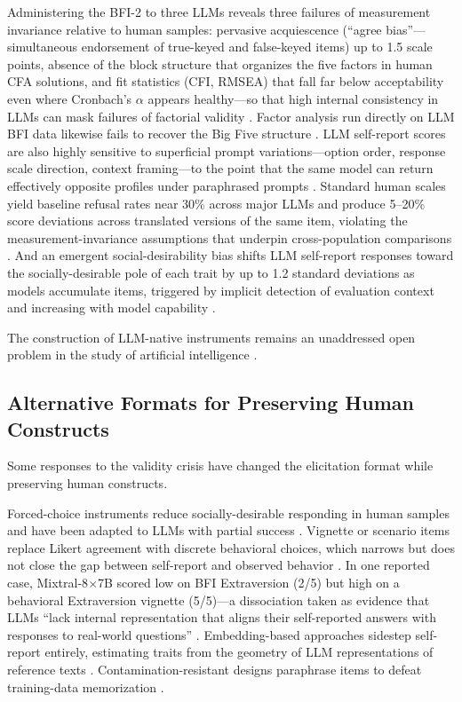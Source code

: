 \documentclass[11pt]{article}
\begin{document}
Administering the BFI-2 to three LLMs reveals three failures of measurement invariance relative to human samples: pervasive acquiescence (``agree bias''---simultaneous endorsement of true-keyed and false-keyed items) up to 1.5 scale points, absence of the block structure that organizes the five factors in human CFA solutions, and fit statistics (CFI, RMSEA) that fall far below acceptability even where Cronbach's $\alpha$ appears healthy---so that high internal consistency in LLMs can mask failures of factorial validity \citep{dorner2023generalize}.
Factor analysis run directly on LLM BFI data likewise fails to recover the Big Five structure \citep{wang2025gpt4roleplay}.
LLM self-report scores are also highly sensitive to superficial prompt variations---option order, response scale direction, context framing---to the point that the same model can return effectively opposite profiles under paraphrased prompts \citep{gupta2024self}.
Standard human scales yield baseline refusal rates near 30\% across major LLMs and produce 5--20\% score deviations across translated versions of the same item, violating the measurement-invariance assumptions that underpin cross-population comparisons \citep{xie2025aipsychobench}.
And an emergent social-desirability bias shifts LLM self-report responses toward the socially-desirable pole of each trait by up to 1.2 standard deviations as models accumulate items, triggered by implicit detection of evaluation context and increasing with model capability \citep{salecha2024social_desirability}.

The construction of LLM-native instruments remains an unaddressed open problem in the study of artificial intelligence \citep{wen2024personality, ye2026llmpsychometrics}.

\subsection{Alternative Formats for Preserving Human Constructs}
\label{sec:rw-alternatives}

Some responses to the validity crisis have changed the elicitation format while preserving human constructs.

Forced-choice instruments reduce socially-desirable responding in human samples and have been adapted to LLMs with partial success \citep{li-etal-2025-decoding-llm}.
Vignette or scenario items replace Likert agreement with discrete behavioral choices, which narrows but does not close the gap between self-report and observed behavior \citep{lee2025trait, li2024psychometrics}. In one reported case, Mixtral-8$\times$7B scored low on BFI Extraversion (2/5) but high on a behavioral Extraversion vignette (5/5)---a dissociation taken as evidence that LLMs ``lack internal representation that aligns their self-reported answers with responses to real-world questions'' \citep{li2024psychometrics}.
Embedding-based approaches sidestep self-report entirely, estimating traits from the geometry of LLM representations of reference texts \citep{maharjan2025personality}.
Contamination-resistant designs paraphrase items to defeat training-data memorization \citep{bhandari2025personality}.
\end{document}
